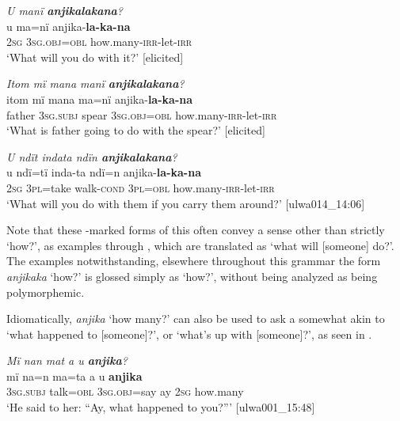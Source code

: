 \ea%
    \label{ex:syntax:27}
          \textit{U manï \textbf{anjikalakana}?}\\
\gll u    ma=nï      anjika-\textbf{la-ka-na}\\
    2\textsc{sg}  3\textsc{sg.obj=obl}  how.many-\textsc{irr-}let-\textsc{irr}\\
\glt `What will you do with it?’ [elicited]
\z

\ea%
    \label{ex:syntax:28}
          \textit{Itom mï mana manï \textbf{anjikalakana}?}\\
\gll itom  mï      mana  ma=nï      anjika-\textbf{la-ka-na}\\
    father  3\textsc{sg.subj}  spear  3\textsc{sg.obj=obl}  how.many-\textsc{irr}{}-let-\textsc{irr}\\
\glt `What is father going to do with the spear?’ [elicited]
\z

\ea%
    \label{ex:syntax:29}
          \textit{U ndït indata ndïn \textbf{anjikalakana}?}\\
\gll u    ndï=tï    inda-ta      ndï=n    anjika-\textbf{la-ka-na}\\
    2\textsc{sg}  3\textsc{pl}=take  walk-\textsc{cond}  3\textsc{pl=obl}  how.many-\textsc{irr}{}-let-\textsc{irr}\\
\glt `What will you do with them if you carry them around?’ [ulwa014\_14:06]
\z

Note that these -marked forms of this  often convey a sense other than strictly ‘how?’, as examples  through , which are translated as ‘what will [someone] do?’. The  examples notwithstanding, elsewhere throughout this grammar the form \textit{anjikaka} ‘how?’ is glossed simply as ‘how?’, without being analyzed as being polymorphemic.


  Idiomatically, \textit{anjika} ‘how many?’ can also be used to ask a  somewhat akin to  ‘what happened to [someone]?’, or ‘what’s up with [someone]?’, as seen in .

\ea%
    \label{ex:syntax:30}
          \textit{Mï nan mat a u \textbf{anjika}?}\\
\gll mï      na=n    ma=ta      a  u    \textbf{anjika}\\
    \textsc{3sg.subj}  talk=\textsc{obl}  3\textsc{sg.obj}=say  ay  2\textsc{sg}  how.many\\
\glt    ‘He said to her: “Ay, what happened to you?”’ [ulwa001\_15:48]
\z

